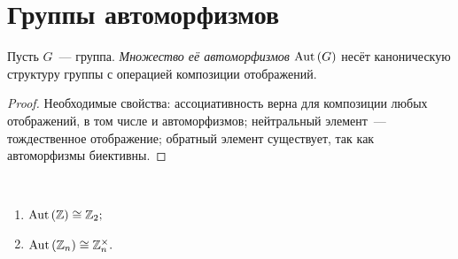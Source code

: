 \newpage
        \section{Группы автоморфизмов}
        \begin{statement}
            Пусть $G$~--- группа. \textit{Множество её автоморфизмов} $\mathrm{Aut} \,(G)$ несёт каноническую структуру группы с операцией композиции отображений.
        \end{statement}
        \begin{proof}
            Необходимые свойства: ассоциативность верна для композиции любых отображений, в том числе и автоморфизмов; нейтральный элемент~--- тождественное отображение; обратный элемент существует, так как автоморфизмы биективны.
        \end{proof}
        \begin{statement}
            \
            \begin{enumerate}
            \setlength\itemsep{0.1em}
                \item ${\mathrm{Aut} \,(\mathbb{Z}) \cong \mathbb{Z}_2;}$
                \item ${\mathrm{Aut} \,(\mathbb{Z}_n) \cong \mathbb{Z}^\times_n.}$
            \end{enumerate}
        \end{statement}
